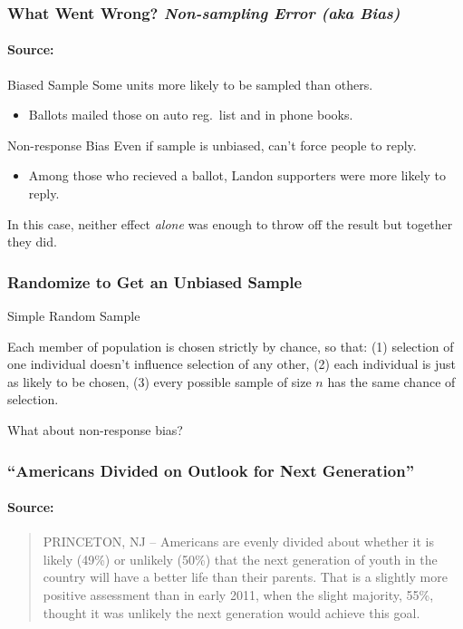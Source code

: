 \documentclass[handout]{beamer}
\begin{document}
\begin{frame}

\frametitle{What Went Wrong? \emph{Non-sampling Error (aka Bias)}}
\framesubtitle{Source: \href{http://www.jstor.org/stable/10.2307/2749114}{}}

\begin{block}{Biased Sample}
Some units more likely to be sampled than others.
	\begin{itemize}
		\item Ballots mailed those on auto reg.\ list and in phone books.
	\end{itemize}
\end{block}

\begin{block}{Non-response Bias}
Even if sample is unbiased, can't force people to reply.
	\begin{itemize}
		\item Among those who recieved a ballot, Landon supporters were more likely to reply.
	\end{itemize}
\end{block}
\alert{In this case, neither effect \emph{alone} was enough to throw off the result but together they did.}
\end{frame}
\begin{frame}
\frametitle{Randomize to Get an Unbiased Sample}

\begin{block}{Simple Random Sample}

Each member of population is chosen strictly by chance, so that: (1) selection of one individual doesn't influence selection of any other, (2) each individual is just as likely to be chosen, (3) every possible sample of size $n$ has the same chance of selection.

\end{block}

\begin{block}{What about non-response bias?}
\end{block}
\end{frame}

\begin{frame}
\frametitle{``Americans Divided on Outlook for Next Generation''}
\framesubtitle{Source: \href{http://www.gallup.com/poll/159737/americans-divided-outlook-next-generation.aspx}{}}
\vspace{1em}
\begin{quote}
PRINCETON, NJ -- Americans are evenly divided about whether it is likely (49\%) or unlikely (50\%) that the next generation of youth in the country will have a better life than their parents. That is a slightly more positive assessment than in early 2011, when the slight majority, 55\%, thought it was unlikely the next generation would achieve this goal.
\end{quote}
\end{frame}
\end{document}
